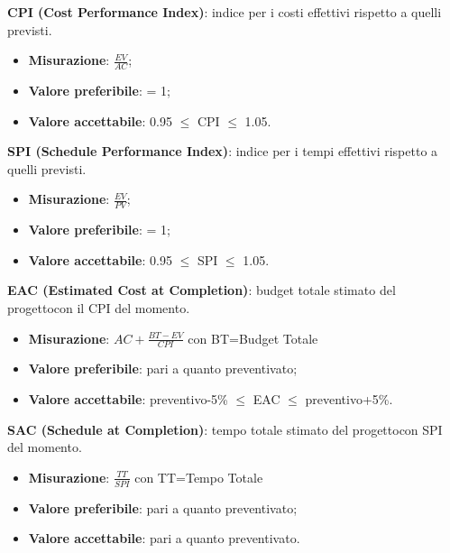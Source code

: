 				\textbf{CPI (Cost Performance Index)}: indice per i costi effettivi rispetto a quelli previsti.
				\begin{itemize}
					\item \textbf{Misurazione}: $\frac{EV}{AC}$;
					\item \textbf{Valore preferibile}: = 1;
					\item \textbf{Valore accettabile}: 0.95 $\le$ CPI $\le$ 1.05.
				\end{itemize}
				\textbf{SPI (Schedule Performance Index)}: indice per i tempi effettivi rispetto a quelli previsti.
				\begin{itemize}
					\item \textbf{Misurazione}: $\frac{EV}{PV}$;
					\item \textbf{Valore preferibile}: = 1;
					\item \textbf{Valore accettabile}: 0.95 $\le$ SPI $\le$ 1.05.
				\end{itemize}
				\textbf{EAC (Estimated Cost at Completion)}: budget totale stimato del progetto\glosp con il CPI del momento.
				\begin{itemize}
					\item \textbf{Misurazione}: $AC+ \frac{BT-EV}{CPI}$ con BT=Budget Totale
					\item \textbf{Valore preferibile}: pari a quanto preventivato;
					\item \textbf{Valore accettabile}: preventivo-5\% $\le$ EAC $\le$ preventivo+5\%.
				\end{itemize}
				\textbf{SAC (Schedule at Completion)}: tempo totale stimato del progetto\glosp con SPI del momento.
				\begin{itemize}
					\item \textbf{Misurazione}: $\frac{TT}{SPI}$ con TT=Tempo Totale
					\item \textbf{Valore preferibile}: pari a quanto preventivato;
					\item \textbf{Valore accettabile}: pari a quanto preventivato.
				\end{itemize}
				
